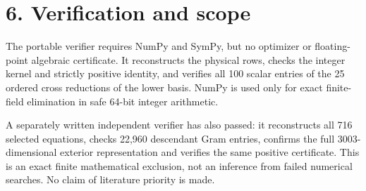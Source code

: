 \documentclass[11pt]{article}
\begin{document}
\section*{6. Verification and scope}
The portable verifier requires NumPy and SymPy, but no optimizer or floating-point algebraic certificate. It reconstructs the physical rows, checks the integer kernel and strictly positive identity, and verifies all 100 scalar entries of the 25 ordered cross reductions of the lower basis. NumPy is used only for exact finite-field elimination in safe 64-bit integer arithmetic.

A separately written independent verifier has also passed: it reconstructs all 716 selected equations, checks 22,960 descendant Gram entries, confirms the full 3003-dimensional exterior representation and verifies the same positive certificate. This is an exact finite mathematical exclusion, not an inference from failed numerical searches. No claim of literature priority is made.
\end{document}

